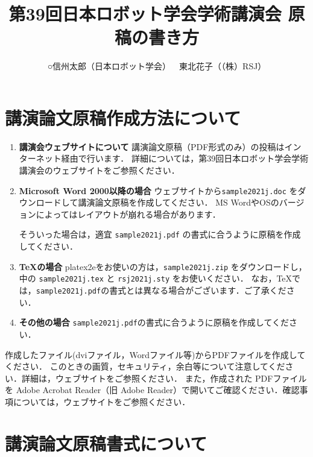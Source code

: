 \documentclass[a4paper]{jarticle}  %
\begin{document}
\title{第39回日本ロボット学会学術講演会 原稿の書き方}
\author{○信州太郎（日本ロボット学会）\ \ 東北花子（（株）RSJ）}

\setlength{\baselineskip}{4.4mm} %
\maketitle

\section{講演論文原稿作成方法について}
\begin{enumerate}
      \item {\bf 講演会ウェブサイトについて}
            講演論文原稿（PDF形式のみ）の投稿はインターネット経由で行います．
            詳細については，第39回日本ロボット学会学術講演会のウェブサイト\cite{website}をご参照ください．

      \item {\bf Microsoft Word 2000以降の場合}
            ウェブサイト\cite{website}から\verb|sample2021j.doc| をダウンロードして講演論文原稿を作成してください．
            MS WordやOSのバージョンによってはレイアウトが崩れる場合があります．

            そういった場合は，適宜 \verb|sample2021j.pdf| の書式に合うように原稿を作成してください．

      \item {\bf \TeX の場合}
            platex2eをお使いの方は，\verb|sample2021j.zip| をダウンロードし，
            中の \verb|sample2021j.tex| と \verb|rsj2021j.sty| をお使いください．
            なお，\TeX では，\verb|sample2021j.pdf|の書式とは異なる場合がございます．ご了承ください．

      \item {\bf その他の場合}
            \verb|sample2021j.pdf|の書式に合うように原稿を作成してください．
\end{enumerate}

作成したファイル(dviファイル，Wordファイル等)からPDFファイルを作成してください．
このときの画質，セキュリティ，余白等について注意してください．詳細は，ウェブサイト\cite{website}をご参照ください．
また，作成された PDFファイルを Adobe Acrobat Reader（旧 Adobe Reader）で開いてご確認ください．確認事項については，ウェブサイト\cite{website}をご参照ください．

\section{講演論文原稿書式について}
\end{document}
